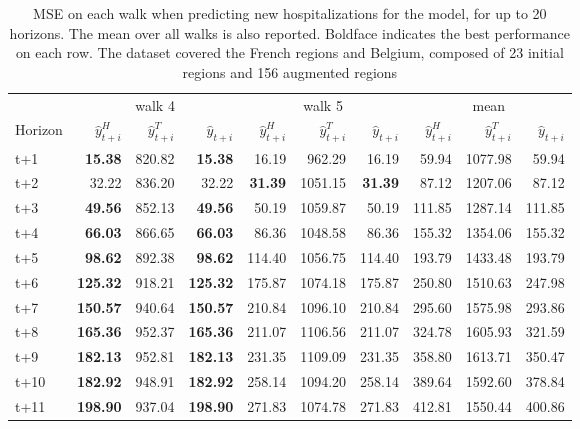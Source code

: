 \begin{table}[H]
\centering
\caption{MSE on each walk when predicting new hospitalizations for the model, for up to 20 horizons. The mean over all walks is also reported. Boldface indicates the best performance on each row. The dataset covered the French regions and Belgium, composed of 23 initial regions and 156 augmented regions }
\label{tab:MSE_walk_assemble}
\begin{tabular}{lrrrrrrrrr}
\toprule
 & \multicolumn{3}{c}{walk 4} & \multicolumn{3}{c}{walk 5} & \multicolumn{3}{c}{mean} 
\\

\cmidrule(lr){2-4} \cmidrule(lr){5-7} \cmidrule(lr){8-10} 
Horizon & $\hat{y}_{t+i}^H$ & $\hat{y}_{t+i}^T$ & $\hat{y}_{t+i}$ & $\hat{y}_{t+i}^H$ & $\hat{y}_{t+i}^T$ & $\hat{y}_{t+i}$ & $\hat{y}_{t+i}^H$ & $\hat{y}_{t+i}^T$ & $\hat{y}_{t+i}$ \\
\midrule
t+1  & \textbf{15.38}  & 820.82  & \textbf{15.38}  & 16.19  & 962.29  & 16.19  & 59.94  & 1077.98  & 59.94  \\
t+2  & 32.22  & 836.20  & 32.22  & \textbf{31.39}  & 1051.15  & \textbf{31.39}  & 87.12  & 1207.06  & 87.12  \\
t+3  & \textbf{49.56}  & 852.13  & \textbf{49.56}  & 50.19  & 1059.87  & 50.19  & 111.85  & 1287.14  & 111.85  \\
t+4  & \textbf{66.03}  & 866.65  & \textbf{66.03}  & 86.36  & 1048.58  & 86.36  & 155.32  & 1354.06  & 155.32  \\
t+5  & \textbf{98.62}  & 892.38  & \textbf{98.62}  & 114.40  & 1056.75  & 114.40  & 193.79  & 1433.48  & 193.79  \\
t+6  & \textbf{125.32}  & 918.21  & \textbf{125.32}  & 175.87  & 1074.18  & 175.87  & 250.80  & 1510.63  & 247.98  \\
t+7  & \textbf{150.57}  & 940.64  & \textbf{150.57}  & 210.84  & 1096.10  & 210.84  & 295.60  & 1575.98  & 293.86  \\
t+8  & \textbf{165.36}  & 952.37  & \textbf{165.36}  & 211.07  & 1106.56  & 211.07  & 324.78  & 1605.93  & 321.59  \\
t+9  & \textbf{182.13}  & 952.81  & \textbf{182.13}  & 231.35  & 1109.09  & 231.35  & 358.80  & 1613.71  & 350.47  \\
t+10  & \textbf{182.92}  & 948.91  & \textbf{182.92}  & 258.14  & 1094.20  & 258.14  & 389.64  & 1592.60  & 378.84  \\
t+11  & \textbf{198.90}  & 937.04  & \textbf{198.90}  & 271.83  & 1074.78  & 271.83  & 412.81  & 1550.44  & 400.86  \\

\end{tabular}
\end{table}
